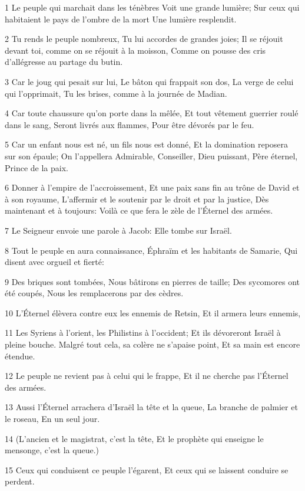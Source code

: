 \par 1 Le peuple qui marchait dans les ténèbres Voit une grande lumière; Sur ceux qui habitaient le pays de l'ombre de la mort Une lumière resplendit.
\par 2 Tu rends le peuple nombreux, Tu lui accordes de grandes joies; Il se réjouit devant toi, comme on se réjouit à la moisson, Comme on pousse des cris d'allégresse au partage du butin.
\par 3 Car le joug qui pesait sur lui, Le bâton qui frappait son dos, La verge de celui qui l'opprimait, Tu les brises, comme à la journée de Madian.
\par 4 Car toute chaussure qu'on porte dans la mêlée, Et tout vêtement guerrier roulé dans le sang, Seront livrés aux flammes, Pour être dévorés par le feu.
\par 5 Car un enfant nous est né, un fils nous est donné, Et la domination reposera sur son épaule; On l'appellera Admirable, Conseiller, Dieu puissant, Père éternel, Prince de la paix.
\par 6 Donner à l'empire de l'accroissement, Et une paix sans fin au trône de David et à son royaume, L'affermir et le soutenir par le droit et par la justice, Dès maintenant et à toujours: Voilà ce que fera le zèle de l'Éternel des armées.
\par 7 Le Seigneur envoie une parole à Jacob: Elle tombe sur Israël.
\par 8 Tout le peuple en aura connaissance, Éphraïm et les habitants de Samarie, Qui disent avec orgueil et fierté:
\par 9 Des briques sont tombées, Nous bâtirons en pierres de taille; Des sycomores ont été coupés, Nous les remplacerons par des cèdres.
\par 10 L'Éternel élèvera contre eux les ennemis de Retsin, Et il armera leurs ennemis,
\par 11 Les Syriens à l'orient, les Philistins à l'occident; Et ils dévoreront Israël à pleine bouche. Malgré tout cela, sa colère ne s'apaise point, Et sa main est encore étendue.
\par 12 Le peuple ne revient pas à celui qui le frappe, Et il ne cherche pas l'Éternel des armées.
\par 13 Aussi l'Éternel arrachera d'Israël la tête et la queue, La branche de palmier et le roseau, En un seul jour.
\par 14 (L'ancien et le magistrat, c'est la tête, Et le prophète qui enseigne le mensonge, c'est la queue.)
\par 15 Ceux qui conduisent ce peuple l'égarent, Et ceux qui se laissent conduire se perdent.
